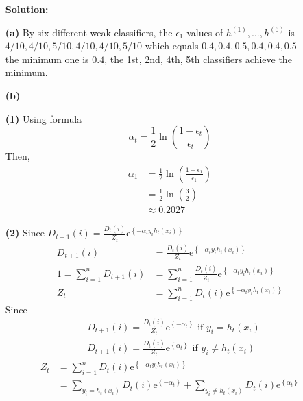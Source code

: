 \documentclass[10pt]{article}
\begin{document}
\begin{enumerate}
\begin{itemize}
\begin{enumerate}
		            \end{enumerate}
	      \end{itemize}
\textbf{Solution:} 	
		\item[\textbf{(a)}]		
		By six different weak classifiers, the $\epsilon_1$ values of $h^{(1)},...,h^{(6)}$ is $4/10,4/10,5/10,4/10,4/10,5/10$ which equals $0.4,0.4,0.5,0.4,0.4,0.5$
		\\the minimum one is $0.4$, the 1st, 2nd, 4th, 5th classifiers achieve the minimum.
		\item[\textbf{(b)}]	
			\item[\textbf{(1)}]
		  	Using formula $$\alpha_{t}=\frac{1}{2} \ln \left(\frac{1-\epsilon_{t}}{\epsilon_{t}}\right)$$
			Then, 
			  $$
			  \begin{aligned}
				\alpha_{1}&=\frac{1}{2} \ln \left(\frac{1-\epsilon_{1}}{\epsilon_{1}}\right)
				\\&=\frac{1}{2}\ln \left(\frac{3}{2}\right)
				\\&\approx 0.2027
			  \end{aligned}
			  $$
			\item[\textbf{(2)}]
			  Since $D_{t+1}(i)=\frac{D_{t}(i)}{Z_{t}} \mathrm{e}^{\left\{-\alpha_{t} y_{i} h_{t}\left(x_{i}\right)\right\}}$
			  $$
			  \begin{aligned}
				D_{t+1}(i)&=\frac{D_{t}(i)}{Z_{t}} \mathrm{e}^{\left\{-\alpha_{t} y_{i} h_{t}\left(x_{i}\right)\right\}}
				\\1=\sum_{i=1}^nD_{t+1}(i)&=\sum_{i=1}^n\frac{D_{t}(i)}{Z_{t}} \mathrm{e}^{\left\{-\alpha_{t} y_{i} h_{t}\left(x_{i}\right)\right\}}
				\\Z_t&=\sum_{i=1}^nD_{t}(i)\mathrm{e}^{\left\{-\alpha_{t} y_{i} h_{t}\left(x_{i}\right)\right\}}
			  \end{aligned}
			  $$
			  Since
			  $$
			  \begin{aligned}
			  &D_{t+1}(i)=\frac{D_{t}(i)}{Z_{t}} \mathrm{e}^{\left\{-\alpha_{t}\right\}} \text { if } y_{i}=h_{t}\left(x_{i}\right) \\
			  &D_{t+1}(i)=\frac{D_{t}(i)}{Z_{t}} \mathrm{e}^{\left\{\alpha_{t}\right\}} \text { if } y_{i} \neq h_{t}\left(x_{i}\right)
			  \end{aligned}
			  $$
			  $$
			  \begin{aligned}
				Z_t&=\sum_{i=1}^nD_{t}(i)\mathrm{e}^{\left\{-\alpha_{t} y_{i} h_{t}\left(x_{i}\right)\right\}}
				\\&=\sum_{y_i=h_t(x_i)}D_{t}(i)\mathrm{e}^{\left\{-\alpha_{t} \right\}}+\sum_{y_i\neq h_t(x_i)}D_{t}(i)\mathrm{e}^{\left\{\alpha_{t} \right\}}

\end{aligned}$$
\end{enumerate}
\end{document}
